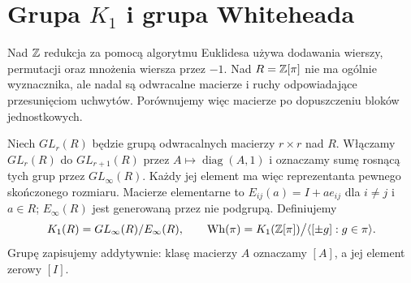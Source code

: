 \section{Grupa \texorpdfstring{$K_1$}{K1} i grupa Whiteheada}
\label{sec:k1-wh-20}

Nad $\mathbb{Z}$ redukcja za pomocą algorytmu Euklidesa używa dodawania wierszy,
permutacji oraz mnożenia wiersza przez $-1$. Nad
$R=\mathbb{Z}[\pi]$ nie ma ogólnie wyznacznika, ale nadal są
odwracalne macierze i ruchy odpowiadające przesunięciom
uchwytów. Porównujemy więc macierze po dopuszczeniu
bloków jednostkowych.

\begin{definicja}[$K_1$ i $\operatorname{Wh}(\pi)$]
\label{def:k1-wh-20}
Niech $GL_r(R)$ będzie grupą odwracalnych macierzy
$r\times r$ nad $R$. Włączamy $GL_r(R)$ do $GL_{r+1}(R)$
przez $A\mapsto\operatorname{diag}(A,1)$ i oznaczamy
sumę rosnącą tych grup przez $GL_\infty(R)$.
Każdy jej element ma więc reprezentanta pewnego skończonego rozmiaru.
Macierze elementarne
to $E_{ij}(a)=I+a e_{ij}$ dla $i\ne j$ i $a\in R$;
$E_\infty(R)$ jest generowaną przez nie podgrupą.
Definiujemy
\[
 K_1(R)=GL_\infty(R)/E_\infty(R),\qquad
 \operatorname{Wh}(\pi)
 =K_1(\mathbb{Z}[\pi])\big/\langle[\pm g]:g\in\pi\rangle.
\]
Grupę zapisujemy addytywnie: klasę macierzy $A$
oznaczamy $[A]$, a jej element zerowy $[I]$.
\end{definicja}

